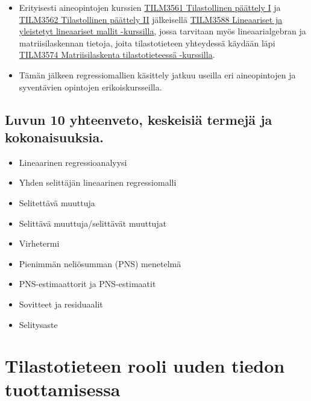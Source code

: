 \documentclass[
]{book}
\providecommand{\tightlist}{%
  \setlength{\itemsep}{0pt}\setlength{\parskip}{0pt}}
\begin{document}
\begin{itemize}
  \begin{itemize}
  \tightlist
  \item
    Erityisesti aineopintojen kurssien \href{https://opas.peppi.utu.fi/fi/opintojakso/TILM3561/5069}{TILM3561 Tilastollinen päättely I} ja \href{https://opas.peppi.utu.fi/fi/opintojakso/TILM3562/5070}{TILM3562 Tilastollinen päättely II} jälkeisellä \href{https://opas.peppi.utu.fi/fi/opintojakso/TILM3588/5071}{TILM3588 Lineaariset ja yleistetyt lineaariset mallit -kurssilla}, jossa tarvitaan myös lineaarialgebran ja matriisilaskennan tietoja, joita tilastotieteen yhteydessä käydään läpi \href{https://opas.peppi.utu.fi/fi/opintojakso/TILM3574/5082}{TILM3574 Matriisilaskenta tilastotieteessä -kurssilla}.
  \item
    Tämän jälkeen regressiomallien käsittely jatkuu useilla eri aineopintojen ja syventävien opintojen erikoiskursseilla.
  \end{itemize}
\end{itemize}

\hypertarget{luvun-10-yhteenveto-keskeisiuxe4-termejuxe4-ja-kokonaisuuksia.}{%
\section{Luvun 10 yhteenveto, keskeisiä termejä ja kokonaisuuksia.}\label{luvun-10-yhteenveto-keskeisiuxe4-termejuxe4-ja-kokonaisuuksia.}}

\begin{itemize}
\tightlist
\item
  Lineaarinen regressioanalyysi
\item
  Yhden selittäjän lineaarinen regressiomalli
\item
  Selitettävä muuttuja
\item
  Selittävä muuttuja/selittävät muuttujat
\item
  Virhetermi
\item
  Pienimmän neliösumman (PNS) menetelmä
\item
  PNS-estimaattorit ja PNS-estimaatit
\item
  Sovitteet ja residuaalit
\item
  Selitysaste
\end{itemize}

\hypertarget{luku11}{%
\chapter{Tilastotieteen rooli uuden tiedon tuottamisessa}\label{luku11}}
\end{document}
